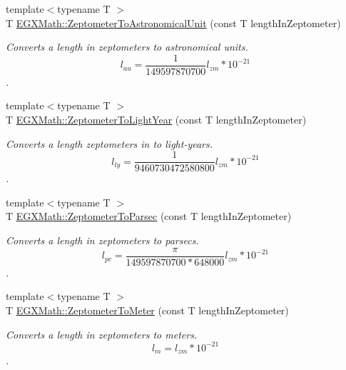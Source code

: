 \begin{DoxyCompactItemize}
\item 
{\footnotesize template$<$typename T $>$ }\\T \mbox{\hyperlink{group___e_g_x_math-_conversions-_length_conversions-_s_i-_zeptometer-_astronomical_ga01bceda59fbfc5414c72ccba254b365c}{E\+G\+X\+Math\+::\+Zeptometer\+To\+Astronomical\+Unit}} (const T length\+In\+Zeptometer)
\begin{DoxyCompactList}\small\item\em Converts a length in zeptometers to astronomical units. \[ l_{au}= \frac{1}{149597870700} l_{zm} * 10^{-21} \]. \end{DoxyCompactList}\item 
{\footnotesize template$<$typename T $>$ }\\T \mbox{\hyperlink{group___e_g_x_math-_conversions-_length_conversions-_s_i-_zeptometer-_astronomical_gaadccc6ef68b9d71b37be40ffbb845843}{E\+G\+X\+Math\+::\+Zeptometer\+To\+Light\+Year}} (const T length\+In\+Zeptometer)
\begin{DoxyCompactList}\small\item\em Converts a length zeptometers in to light-\/years. \[ l_{ly}= \frac{1}{9460730472580800} l_{zm} * 10^{-21} \]. \end{DoxyCompactList}\item 
{\footnotesize template$<$typename T $>$ }\\T \mbox{\hyperlink{group___e_g_x_math-_conversions-_length_conversions-_s_i-_zeptometer-_astronomical_gac8c853b247f3b577cee5510bd43fcd65}{E\+G\+X\+Math\+::\+Zeptometer\+To\+Parsec}} (const T length\+In\+Zeptometer)
\begin{DoxyCompactList}\small\item\em Converts a length in zeptometers to parsecs. \[ l_{pc}=\frac{\pi}{149597870700 * 648000} l_{zm} * 10^{-21} \]. \end{DoxyCompactList}\item 
{\footnotesize template$<$typename T $>$ }\\T \mbox{\hyperlink{group___e_g_x_math-_conversions-_length_conversions-_s_i-_zeptometer-_s_i_gaf51d88eb55e387d6ee07a02f2229be97}{E\+G\+X\+Math\+::\+Zeptometer\+To\+Meter}} (const T length\+In\+Zeptometer)
\begin{DoxyCompactList}\small\item\em Converts a length in zeptometers to meters. \[ l_{m}=l_{zm} * 10^{-21} \]. \end{DoxyCompactList}\item 

\end{DoxyCompactItemize}
